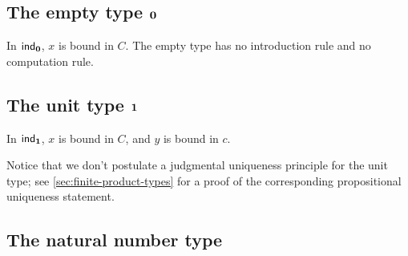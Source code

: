 \subsection{The empty type \texorpdfstring{$\mathbf{0}$}{0}}

%

%
In $\mathsf{ind}_{\mathbf{0}}$, $x$ is bound in $C$. The empty type has no introduction rule and no computation rule.

\subsection{The unit type \texorpdfstring{$\mathbf{1}$}{1}}

%

%
In $\mathsf{ind}_{\mathbf{1}}$, $x$ is bound in $C$, and $y$ is bound in $c$.

Notice that we don't postulate a judgmental uniqueness principle for the unit
type; see \autoref{sec:finite-product-types} for a proof of the corresponding
propositional uniqueness statement.

\subsection{The natural number type}

%

